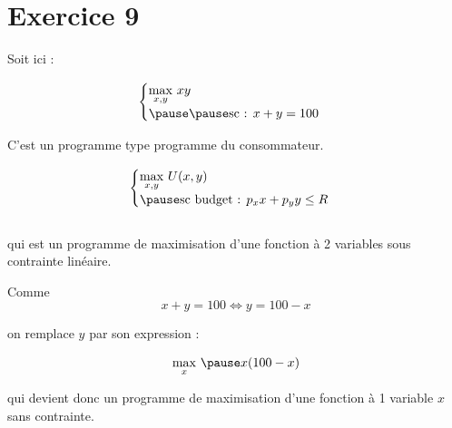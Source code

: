 \documentclass[9pt,handout,professionalfonts,hyperref]{beamer}
\begin{document}
\section{Exercice 9}

\begin{frame}

Soit ici : \newline

\[\begin{aligned}
\begin{cases}
\underset{x,y}{\max}~xy \\
\pause \pause \text{sc : } x + y =100
\end{cases}
\end{aligned}\]\newline

\pause C'est un programme type programme du consommateur.

\[\begin{aligned}
\begin{cases}
\underset{x,y}{\max}~U(x,y) \\
\pause \text{sc budget : } p_xx + p_yy \le R
\end{cases}
\end{aligned}\]\\

qui est un programme de maximisation d'une fonction à 2 variables sous contrainte linéaire.
\end{frame}

\begin{frame}

Comme
$$
x+y=100  \Leftrightarrow y=100-x
$$

\pause on remplace $y$ par son expression :

\[\begin{aligned}
\underset{x}{\max}~\pause x(100-x)
\end{aligned}\]

\pause qui devient donc un programme de maximisation d'une fonction à 1 variable $x$ sans contrainte.

\end{frame}
\end{document}
